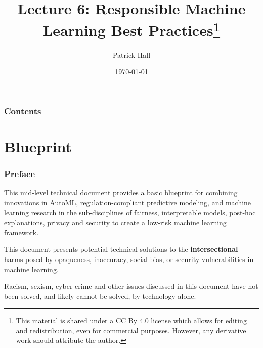 \documentclass[11pt,
               aspectratio=169,
               hyperref={colorlinks}
               ]{beamer}
\author{Patrick Hall}
\title{Lecture 6: Responsible Machine Learning Best Practices\footnote{\tiny{This material is shared under a \href{https://creativecommons.org/licenses/by/4.0/deed.ast}{CC By 4.0 license} which allows for editing and redistribution, even for commercial purposes. However, any derivative work should attribute the author.}}}
\institute{The George Washington University}
\date{\today}
\begin{document}
	
	\maketitle
	
	\begin{frame}
	
		\frametitle{Contents}
		
		\tableofcontents{}
		
	\end{frame}

	\section{Blueprint}
	
		\begin{frame}
		
			\frametitle{Preface}			
			
			This mid-level technical document provides a basic blueprint for combining innovations in AutoML, regulation-compliant predictive modeling, and machine learning research in the sub-disciplines of fairness, interpretable models, post-hoc explanations, privacy and security to create a low-risk machine learning framework.\\
			
			\vspace{10pt}			
			
			This document presents potential technical solutions to the \textbf{intersectional} harms posed by opaqueness, inaccuracy, social bias, or security vulnerabilities in machine learning.
			
			\vspace{10pt}
			
			Racism, sexism, cyber-crime and other issues discussed in this document have not been solved, and likely cannot be solved, by technology alone.  
			
		\end{frame}					
		
\end{document}
